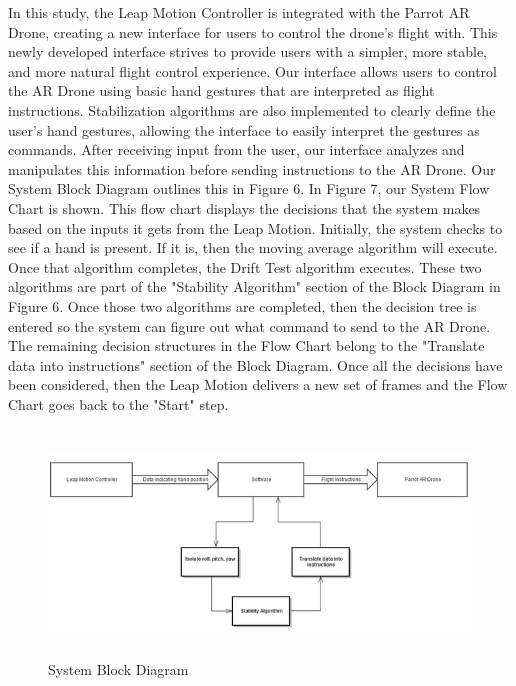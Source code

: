\documentclass[letterpaper,english, 12pt]{article}
\begin{document}
 
In this study, the Leap Motion Controller is integrated with the Parrot AR Drone, creating a new interface for users to control the drone's flight with. This newly developed interface strives to provide users with a simpler, more stable, and more natural flight control experience. Our interface allows users to control the AR Drone using basic hand gestures that are interpreted as flight instructions. Stabilization algorithms are also implemented to clearly define the user's hand gestures, allowing the interface to easily interpret the gestures as commands. After receiving input from the user, our interface analyzes and manipulates this information before sending instructions to the AR Drone. Our System Block Diagram outlines this in Figure 6. In Figure 7, our System Flow Chart is shown. This flow chart displays the decisions that the system makes based on the inputs it gets from the Leap Motion. Initially, the system checks to see if a hand is present. If it is, then the moving average algorithm will execute. Once that algorithm completes, the Drift Test algorithm executes. These two algorithms are part of the "Stability Algorithm" section of the Block Diagram in Figure 6. Once those two algorithms are completed, then the decision tree is entered so the system can figure out what command to send to the AR Drone.  The remaining decision structures in the Flow Chart belong to the "Translate data into instructions" section of the Block Diagram. Once all the decisions have been considered, then the Leap Motion delivers a new set of frames and the Flow Chart goes back to the "Start" step.

\vspace{3cm}

\begin{figure}[H]
	\centering
	\includegraphics[height=6cm,width=140mm]{pics/blockDiagram1.jpg}
	\caption{System Block Diagram}
\end{figure}
\end{document}
